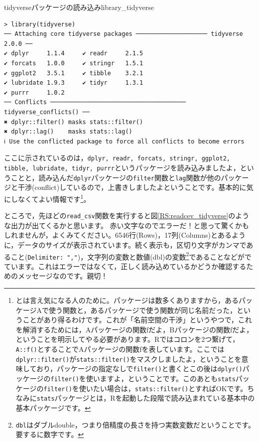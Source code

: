 \documentclass{ltjsbook}
\begin{document}
\begin{Rscreen}{tidyverseパッケージの読み込み}{library_tidyverse}
	\begin{verbatim}
> library(tidyverse)
── Attaching core tidyverse packages ──────────────────── tidyverse 2.0.0 ──
✔ dplyr     1.1.4     ✔ readr     2.1.5
✔ forcats   1.0.0     ✔ stringr   1.5.1
✔ ggplot2   3.5.1     ✔ tibble    3.2.1
✔ lubridate 1.9.3     ✔ tidyr     1.3.1
✔ purrr     1.0.2     
── Conflicts ────────────────────────────────────── tidyverse_conflicts() ──
✖ dplyr::filter() masks stats::filter()
✖ dplyr::lag()    masks stats::lag()
ℹ Use the conflicted package to force all conflicts to become errors
\end{verbatim}
\end{Rscreen}
ここに示されているのは，\verb|dplyr, readr, forcats, stringr, ggplot2, tibble, lubridate, tidyr, purrr|というパッケージを読み込みましたよ，ということと，読み込んだ\verb|dplyr|パッケージの\verb|filter|関数と\verb|lag|関数が他のパッケージと干渉(conflict)しているので，上書きしましたよということです。基本的に気にしなくてよい情報です\footnote{とは言え気になる人のために。パッケージは数多くありますから，あるパッケージAで使う関数と，あるパッケージで使う関数が同じ名前だった，ということがあり得るわけです。これが「名前空間の干渉」というやつで，これを解消するためには，Aパッケージの関数fだよ，Bパッケージの関数fだよ，ということを明示してやる必要があります。Rではコロンを2つ繋げて，\verb|A::f()|とすることでAパッケージの関数fを表しています。ここでは\verb|dplyr::filter()|が\verb|stats::filter()|をマスクしましたよ，ということを意味しており，パッケージの指定なしで\verb|filter()|と書くとこの後は\verb|dplyr()|パッケージの\verb|filter()|を使いますよ，ということです。このあとも\verb|stats|パッケージの\verb|filter()|を使いたい場合は，\verb|stats::filter()|とすればOKです。ちなみに\verb|stats|パッケージとは，Rを起動した段階で読み込まれている基本中の基本パッケージです。}。

ところで，先ほどの\verb|read_csv|関数を実行すると図\ref{RS:readcev_tidyverse}のような出力が出てくるかと思います。
赤い文字なのでエラーだ！と思って驚くかもしれませんが，よくみてください。6546行(Rows)，17列(Columns)とあるように，データのサイズが表示されています。続く表示も，区切り文字がカンマであること(\verb|Delimiter: ","|)，文字列の変数と数値(dbl)の変数\footnote{\verb|dbl|はダブルdouble，つまり倍精度の長さを持つ実数変数だということです。要するに数字です。}であることなどがでています。これはエラーではなくて，正しく読み込めているかどうか確認するためのメッセージなのです。親切！
\end{document}

